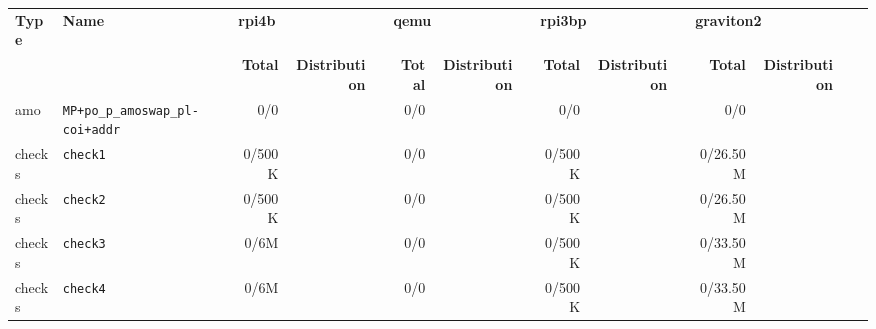 \begin{tabular}{l l  | r r l | r r l | r r l | r r l l}
   \textbf{Type} & \textbf{Name}                                              & \multicolumn{3}{l}{\textbf{rpi4b}}                         & \multicolumn{3}{l}{\textbf{qemu}}                       & \multicolumn{3}{l}{\textbf{rpi3bp}}                         & \multicolumn{3}{l}{\textbf{graviton2}}                         & \\
                 &                                                            & \textbf{Total} & \textbf{Distribution} &                   & \textbf{Total} & \textbf{Distribution} &                 & \textbf{Total} & \textbf{Distribution} &                   & \textbf{Total} & \textbf{Distribution} &                   & \\
             amo &                         \verb|MP+po_p_amoswap_pl-coi+addr| &            0/0 &                       &                   &            0/0 &                       &                 &            0/0 &                       &                   &            0/0 &                       &                   & \\ \hline 
          checks &                                              \verb|check1| &         0/500K &                       &                   &            0/0 &                       &                 &         0/500K &                       &                   &       0/26.50M &                       &                   & \\ \hline 
          checks &                                              \verb|check2| &         0/500K &                       &                   &            0/0 &                       &                 &         0/500K &                       &                   &       0/26.50M &                       &                   & \\ \hline 
          checks &                                              \verb|check3| &           0/6M &                       &                   &            0/0 &                       &                 &         0/500K &                       &                   &       0/33.50M &                       &                   & \\ \hline 
          checks &                                              \verb|check4| &           0/6M &                       &                   &            0/0 &                       &                 &         0/500K &                       &                   &       0/33.50M &                       &                   & \\ \hline 

\end{tabular}
